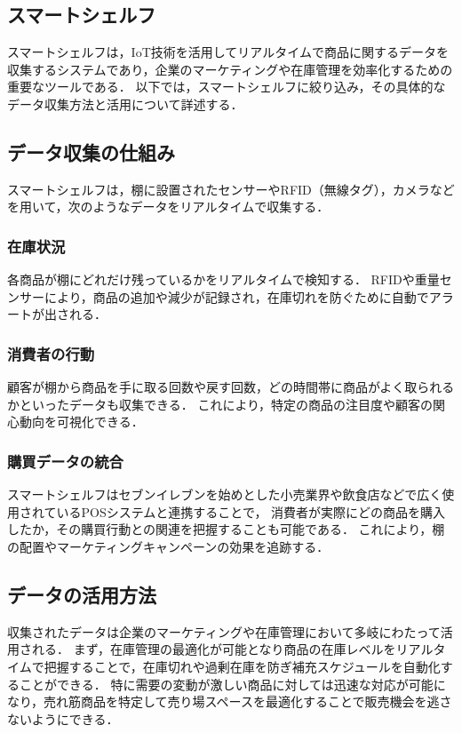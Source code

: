 \documentclass[titlepage,a4paper]{jsarticle}
\begin{document}
\subsection{スマートシェルフ}
スマートシェルフは，IoT技術を活用してリアルタイムで商品に関するデータを収集するシステムであり，企業のマーケティングや在庫管理を効率化するための重要なツールである．
以下では，スマートシェルフに絞り込み，その具体的なデータ収集方法と活用について詳述する．

\subsection{データ収集の仕組み}
スマートシェルフは，棚に設置されたセンサーやRFID（無線タグ），カメラなどを用いて，次のようなデータをリアルタイムで収集する．

\subsubsection{在庫状況}
各商品が棚にどれだけ残っているかをリアルタイムで検知する．
RFIDや重量センサーにより，商品の追加や減少が記録され，在庫切れを防ぐために自動でアラートが出される．

\subsubsection{消費者の行動}
顧客が棚から商品を手に取る回数や戻す回数，どの時間帯に商品がよく取られるかといったデータも収集できる．
これにより，特定の商品の注目度や顧客の関心動向を可視化できる． 

\subsubsection{購買データの統合}
スマートシェルフはセブンイレブンを始めとした小売業界や飲食店などで広く使用されているPOSシステムと連携することで，
消費者が実際にどの商品を購入したか，その購買行動との関連を把握することも可能である．
これにより，棚の配置やマーケティングキャンペーンの効果を追跡する．

\subsection{データの活用方法}
収集されたデータは企業のマーケティングや在庫管理において多岐にわたって活用される．
まず，在庫管理の最適化が可能となり商品の在庫レベルをリアルタイムで把握することで，在庫切れや過剰在庫を防ぎ補充スケジュールを自動化することができる．
特に需要の変動が激しい商品に対しては迅速な対応が可能になり，売れ筋商品を特定して売り場スペースを最適化することで販売機会を逃さないようにできる．
\end{document}
